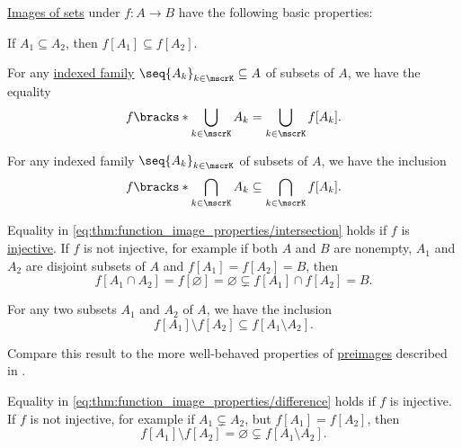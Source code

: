 \begin{proposition}\label{thm:function_image_properties}
  \hyperref[def:set_valued_map/image]{Images of sets} under \( f: A \to B \) have the following basic properties:
  \begin{thmenum}
     If \( A_1 \subseteq A_2 \), then \( f[A_1] \subseteq f[A_2] \).

     For any \hyperref[def:cartesian_product/indexed_family]{indexed family} \( \seq{ A_k }_{k \in \mscrK} \subseteq A \) of subsets of \( A \), we have the equality
    \begin{equation}\label{eq:thm:function_image_properties/union}
      f\bracks*{ \bigcup_{k \in \mscrK} A_k } = \bigcup_{k \in \mscrK} f[A_k].
    \end{equation}

     For any indexed family \( \seq{ A_k }_{k \in \mscrK} \) of subsets of \( A \), we have the inclusion
    \begin{equation}\label{eq:thm:function_image_properties/intersection}
      f\bracks*{ \bigcap_{k \in \mscrK} A_k } \subseteq \bigcap_{k \in \mscrK} f[A_k].
    \end{equation}

    Equality in \eqref{eq:thm:function_image_properties/intersection} holds if \( f \) is \hyperref[def:function_invertibility/injective]{injective}. If \( f \) is not injective, for example if both \( A \) and \( B \) are nonempty, \( A_1 \) and \( A_2 \) are disjoint subsets of \( A \) and \( f[A_1] = f[A_2] = B \), then
    \begin{equation*}
      f[A_1 \cap A_2] = f[\varnothing] = \varnothing \subsetneq f[A_1] \cap f[A_2] = B.
    \end{equation*}

     For any two subsets \( A_1 \) and \( A_2 \) of \( A \), we have the inclusion
    \begin{equation}\label{eq:thm:function_image_properties/difference}
      f[A_1] \setminus f[A_2] \subseteq f[A_1 \setminus A_2].
    \end{equation}
  \end{thmenum}
\end{proposition}
\begin{comments}
  \item Compare this result to the more well-behaved properties of \hyperref[def:set_valued_map/inverse]{preimages} described in .

  \item Equality in \eqref{eq:thm:function_image_properties/difference} holds if \( f \) is injective. If \( f \) is not injective, for example if \( A_1 \subsetneq A_2 \), but \( f[A_1] = f[A_2] \), then
  \begin{equation*}
    f[A_1] \setminus f[A_2] = \varnothing \subsetneq f[A_1 \setminus A_2].
  \end{equation*}
\end{comments}
